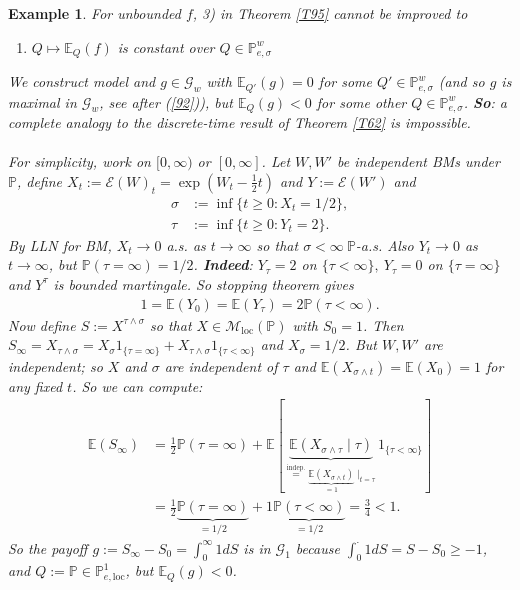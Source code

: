 \documentclass[12pt,a4paper, twoside]{article}
\newtheorem{exmp}{Example}[section]
\theoremstyle{definition}
\newcommand{\EE}{\mathbb{E}} %
\newcommand{\PP}{\mathbb{P}} %
\begin{document}
\begin{exmp} For unbounded $f$, 3) in Theorem \ref{T95} cannot be improved to 
\begin{enumerate}
\item[3'.] $Q \mapsto \EE_Q(f)$ is constant over $Q \in \PP_{e, \sigma}^w$
\end{enumerate}
We construct model and $g \in \mathcal{G}_w$ with $\EE_{Q'}(g)=0$ for some $Q' \in \PP_{e, \sigma}^w$ (and so $g$ is maximal in $\mathcal{G}_w$, see after (\ref{92})), but $\EE_Q(g) <0$ for some other $Q \in \PP_{e, \sigma}^w $. \textbf{So}: a complete analogy to the discrete-time result of Theorem \ref{T62} is impossible. \\
\\
For simplicity,  work on $[0, \infty)$ or $[0, \infty]$. Let $W,W'$ be independent BMs under $\PP$, define $X_t:= \mathcal{E}(W)_t = \exp(W_t- \frac{1}{2}t)$ and $Y:= \mathcal{E}(W')$ and 
\begin{align*}
\sigma&:= \inf \{ t \geq 0 : X_t = 1/2\}, \\
\tau &:= \inf\{ t \geq 0 : Y_t = 2 \}.  
\end{align*}
By LLN for BM, $X_t \to 0$ a.s. as $t \to \infty$ so that $\sigma < \infty \ \PP$-a.s. Also $Y_t \to 0$ as $t \to \infty$, but $\PP( \tau = \infty) = 1/2$. \textbf{Indeed}: $Y_\tau = 2$ on $\{ \tau < \infty\}, \ Y_\tau =0$ on $\{ \tau = \infty\}$ and $Y^\tau$ is bounded martingale. So stopping theorem gives
\begin{align*}
1 = \EE(Y_0)= \EE( Y_\tau) = 2 \PP( \tau < \infty). 
\end{align*} 
Now define $S:= X^{ \tau \wedge \sigma}$ so that $X \in \mathcal{M}_\text{loc}(\PP)$ with $S_0=1$. Then $S_\infty = X_{ \tau \wedge \sigma} = X_\sigma 1_{\{ \tau = \infty\}} + X_{ \tau \wedge \sigma} 1_{\{ \tau < \infty\}}$ and $X_\sigma = 1/2$. But $W,W'$ are independent; so $X$ and $\sigma$ are independent of $\tau$ and $\EE( X_{ \sigma \wedge t})= \EE(X_0)=1$ for any fixed $t$. So we can compute: 
\begin{align*}
\EE(S_\infty) &= \frac{1}{2} \PP( \tau = \infty) + \EE[ \underbrace{\EE( X_{ \sigma \wedge \tau} \mid \tau)}_{ \overset{\text{indep.}}= \underbrace{\EE(X_{ \sigma \wedge t})}_{=1} \mid_{t = \tau}} 1_{\{ \tau < \infty\}} ] \\
&= \frac{1}{2} \underbrace{\PP( \tau = \infty)}_{=1/2} + 1 \underbrace{\PP( \tau < \infty)}_{=1/2} = \frac{3}{4}< 1. 
\end{align*}
So the payoff $g:= S_\infty - S_0 = \int_0^\infty 1 dS$ is in $\mathcal{G}_1$ because $\int_0^\cdot 1dS = S-S_0 \geq -1$, and $Q:= \PP \in \PP_{e, \text{loc}}^1$, but $\EE_Q(g) < 0$. 

\end{exmp}
\end{document}
